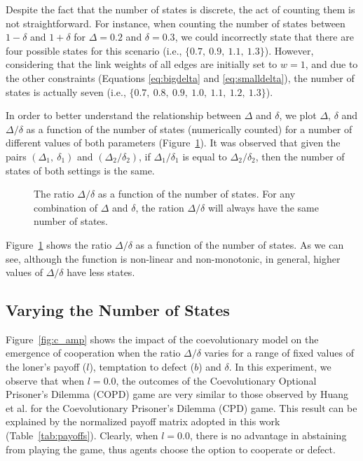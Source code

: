 \documentclass{llncs}
\begin{document}
Despite the fact that the number of states is discrete, the act of counting
them is not straightforward. For instance, when counting the number of
states between $1-\delta$ and $1+\delta$ for $\Delta=0.2$ and $\delta=0.3$, we
could incorrectly state that there are four possible states for this scenario
(i.e., $\{0.7,\ 0.9,\ 1.1,\ 1.3\}$).  However, considering that the link weights
of all edges are initially set to $w=1$, and due to the other constraints
(Equations \ref{eq:bigdelta} and \ref{eq:smalldelta}), the number of states is
actually seven (i.e., $\{0.7,\ 0.8,\ 0.9,\ 1.0,\ 1.1,\ 1.2,\ 1.3\}$).

In order to better understand the relationship between $\Delta$ and $\delta$,
we plot $\Delta$, $\delta$ and $\Delta/\delta$ as a function of the number of
states (numerically counted) for a number of different values of both
parameters (Figure~\ref{fig:delta}).  It was observed that given the pairs
$(\Delta_1,\ \delta_1)$ and $(\Delta_2/\delta_2)$, if $\Delta_1/\delta_1$ is
equal to $\Delta_2/\delta_2$, then the number of states of both settings is the
same.

\begin{figure}[tb]
    \centering
    {}
    \caption{
        The ratio $\Delta/\delta$ as a function of the number of states. For any combination
        of $\Delta$ and $\delta$, the ration $\Delta/\delta$ will always have the same number
        of states.
    }
    \label{fig:delta}
\end{figure}

Figure~\ref{fig:delta} shows the ratio $\Delta/\delta$ as a function of the
number of states.  As we can see, although the function is non-linear and
non-monotonic, in general, higher values of $\Delta/\delta$ have less states.


\subsection{Varying the Number of States}

Figure~\ref{fig:c_amp} shows the impact of the coevolutionary model on the
emergence of cooperation when the ratio $\Delta/\delta$ varies for a range of
fixed values of the loner's payoff ($l$), temptation to defect ($b$) and
$\delta$. In this experiment, we observe that when $l=0.0$, the outcomes of the
Coevolutionary Optional Prisoner's Dilemma (COPD) game are very similar to
those observed by Huang et al. \cite{Huang2015} for the Coevolutionary
Prisoner's Dilemma (CPD) game. This result can be explained by the normalized
payoff matrix adopted in this work (Table~\ref{tab:payoffs}). Clearly,
when $l=0.0$, there is no advantage in abstaining from playing the game,
thus agents choose the option to cooperate or defect.
\end{document}
